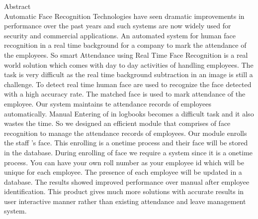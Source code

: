 \newpage
\thispagestyle{empty}

\begin{center}

\huge{Abstract}\\[0.5cm]
\normalsize
\textsc Automatic Face Recognition Technologies have seen dramatic improvements in performance over the past
years and such systems are now widely used for security and commercial applications. An automated system for human
face recognition in a real time background for a company to mark the attendance of the employees.
So smart Attendance using Real Time Face Recognition is a real world solution which comes with day to day activities
of handling employees. The task is very difficult as the real time background subtraction in an image is still a challenge.
To detect real time human face are used to recognize the face detected with a high accuracy rate. The matched face is
used to mark attendance of the employee.
Our system maintains te attendance records of employees automatically. Manual Entering of in logbooks becomes a
difficult task and it also wastes the time. So we designed an efficient module that comprises of face recognition to manage
the attendance records of employees. Our module enrolls the staff ’s face. This enrolling is a onetime process and their
face will be stored in the database. During enrolling of face we require a system since it is a onetime process. You can
have your own roll number as your employee id which will be unique for each employee.
The presence of each employee will be updated in a database. The results showed improved performance over manual
after employee identification. This product gives much more solutions with accurate results in user interactive manner
rather than existing attendance and leave management system.

\\[2.0cm]

\end{center}
\normalsize 



